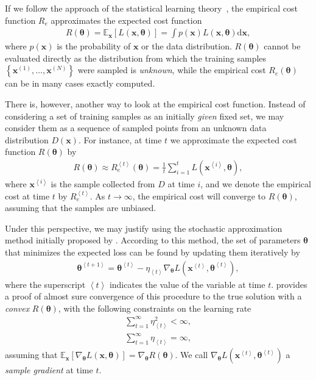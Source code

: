 \documentclass{now}
\newcommand{\qexp}[1]{\left<#1\right>}
\newcommand{\vect}[1]{\mathbf{#1}}
\newcommand{\vects}[1]{\boldsymbol{#1}}
\newcommand{\vx}[0]{\vect{x}}
\newcommand{\TT}[0]{{\vects{\theta}}}
\newcommand{\E}[0]{\mathbb{E}}
\newcommand{\dd}[1]{\text{d}{#1}}
\begin{document}
If we follow the approach of the statistical learning theory~\citep[see,
e.g.][]{Vapnik1995}, the empirical cost function $R_e$ approximates the expected
cost function 
\begin{align}
    \label{eq:slt_exp_cost}
    R(\TT) = \E_{\vx} \left[ L(\vx, \TT) \right] = \int
    p(\vx) L(\vx, \TT) \dd{\vx},
\end{align}
where $p(\vx)$ is the probability of $\vx$ or the data distribution.  $R(\TT)$
cannot be evaluated directly as the distribution from which the training samples
$\left\{ \vx^{(1)}, \dots, \vx^{(N)} \right\}$ were sampled is \textit{unknown},
while the empirical cost $R_e(\TT)$ can be in many cases exactly computed.

There is, however, another way to look at the empirical cost function. Instead
of considering a set of training samples as an initially \textit{given} fixed
set, we may consider them as a sequence of sampled points from an unknown data
distribution $D(\vx)$. For instance, at time $t$ we approximate the expected
cost function $R(\TT)$ by
\begin{align*}
    R(\TT) \approx R_e^{\qexp{t}}(\TT) = \frac{1}{t}
    \sum_{i=1}^t L(\vx^{\qexp{i}}, \TT),
\end{align*}
where $\vx^{\qexp{i}}$ is the sample collected from $D$ at time $i$, and we
denote the empirical cost at time $t$ by $R_e^{\qexp{t}}$. As $t\to\infty$, the
empirical cost will converge to $R(\TT)$, assuming that the samples are
unbiased.

Under this perspective, we may justify using the stochastic approximation method
initially proposed by \citet{Robbins1951}.  According to this method, the set of
parameters $\TT$ that minimizes the expected loss can be found by updating them
iteratively by
\begin{align}
    \label{eq:sgd_grad}
    \TT^{\qexp{t+1}} = \TT^{\qexp{t}} - \eta_{\qexp{t}} \nabla_{\TT} L(\vx^{\qexp{t}},
    \TT^{\qexp{t}}),
\end{align}
where the superscript $\qexp{t}$ indicates the value of the variable at time
$t$. \citet{Bottou1998} provides a proof of almost sure convergence of this
procedure to the true solution with a \textit{convex} $R(\TT)$, with the
following constraints on the learning rate
\begin{align}
    \label{eq:sgd_lr_cond1}
    \sum_{t=1}^\infty \eta_{\qexp{t}}^2 < \infty, \\
    \label{eq:sgd_lr_cond2}
    \sum_{t=1}^\infty \eta_{\qexp{t}} = \infty,
\end{align}
assuming that $\E_\vx \left[ \nabla_{\TT} L(\vx, \TT) \right] = \nabla_\TT
R(\TT)$. We call $\nabla_{\TT} L(\vx^{\qexp{t}}, \TT^{\qexp{t}})$ a
\textit{sample gradient} at time $t$.
\end{document}
